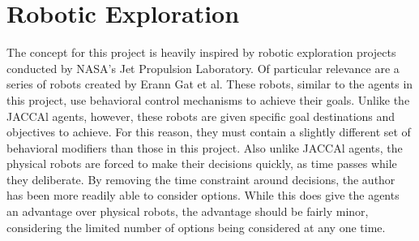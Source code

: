 \documentclass[12pt]{article}
\begin{document}
\section{Robotic Exploration}
The concept for this project is heavily inspired by robotic exploration projects conducted by NASA's Jet Propulsion Laboratory. Of particular relevance are a series of robots created by Erann Gat et al\cite{gat}. These robots, similar to the agents in this project, use behavioral control mechanisms to achieve their goals. Unlike the JACCAl agents, however, these robots are given specific goal destinations and objectives to achieve. For this reason, they must contain a slightly different set of behavioral modifiers than those in this project. Also unlike JACCAl agents, the physical robots are forced to make their decisions quickly, as time passes while they deliberate. By removing the time constraint around decisions, the author has been more readily able to consider options. While this does give the agents an advantage over physical robots, the advantage should be fairly minor, considering the limited number of options being considered at any one time.



\pagebreak
\nocite{*}

{}
\end{document}
